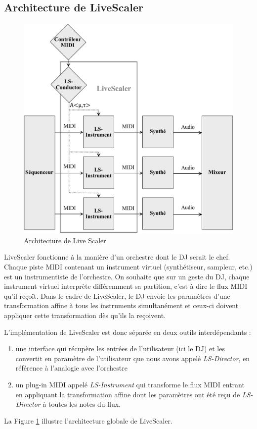 \subsection{Architecture de LiveScaler}

\begin{figure}[htbp]
  \centering
  \includegraphics[width=\textwidth]{Figures/architecture-LS.pdf}
  \caption{Architecture de Live Scaler\label{Fig:archi}}
\end{figure}

LiveScaler fonctionne à la manière d'un orchestre dont le DJ serait le chef. Chaque piste MIDI contenant un instrument virtuel (synthétiseur, sampleur, etc.) est un instrumentiste de l'orchestre. On souhaite que sur un geste du DJ, chaque instrument virtuel interprète différemment sa partition, c'est à dire le flux MIDI qu'il reçoît. Dans le cadre de LiveScaler, le DJ envoie les paramètres d'une transformation affine à tous les instruments simultanément et ceux-ci doivent appliquer cette transformation dès qu'ils la reçoivent.

L'implémentation de LiveScaler est donc séparée en deux outils interdépendants : 
\begin{enumerate}
  \item une interface qui récupère les entrées de l'utilisateur (ici le DJ) et les convertit en paramètre de l'utilisateur que nous avons appelé \emph{LS-Director}, en référence à l'analogie avec l'orchestre
  \item un plug-in MIDI appelé \emph{LS-Instrument} qui transforme le flux MIDI entrant en appliquant la transformation affine dont les paramètres ont été reçu de \emph{LS-Director} à toutes les notes du flux.
\end{enumerate}
La Figure \ref{Fig:archi} illustre l'architecture globale de LiveScaler.

